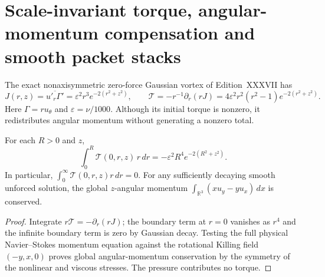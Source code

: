 
\section{Scale-invariant torque, angular-momentum compensation and smooth packet stacks}
\label{sec:xxxviii-scale}
The exact nonaxisymmetric zero-force Gaussian vortex of Edition~XXXVII has
\[
J(r,z)=\overline{u'_r\Gamma'}=\varepsilon^2r^3e^{-2(r^2+z^2)},\qquad
\mathcal T=-r^{-1}\partial_r(rJ)
=4\varepsilon^2r^2(r^2-1)e^{-2(r^2+z^2)}.
\]
Here $\Gamma=ru_\theta$ and $\varepsilon=\nu/1000$.
Although its initial torque is nonzero, it redistributes angular momentum
without generating a nonzero total.

\begin{proposition}
\label{prop:xxxviii-compensation}
For each $R>0$ and $z$,
\begin{equation}\label{eq:xxxviii-balance}
\boxed{\quad\int_0^R\mathcal T(0,r,z)\,r\,dr
=-\varepsilon^2R^4e^{-2(R^2+z^2)}.\quad}
\end{equation}
In particular, $\int_0^\infty\mathcal T(0,r,z)r\,dr=0$.
For any sufficiently decaying smooth unforced solution,
the global $z$-angular momentum
$\int_{\mathbb R^3}(xu_y-yu_x)\,dx$ is conserved.
\end{proposition}
\begin{proof}
Integrate $r\mathcal T=-\partial_r(rJ)$;
the boundary term at $r=0$ vanishes as $r^4$ and the
infinite boundary term is zero by Gaussian decay.
Testing the full physical Navier--Stokes momentum equation
against the rotational Killing field $(-y,x,0)$ proves global
angular-momentum conservation by the symmetry of the nonlinear
and viscous stresses. The pressure contributes no torque.
\end{proof}

